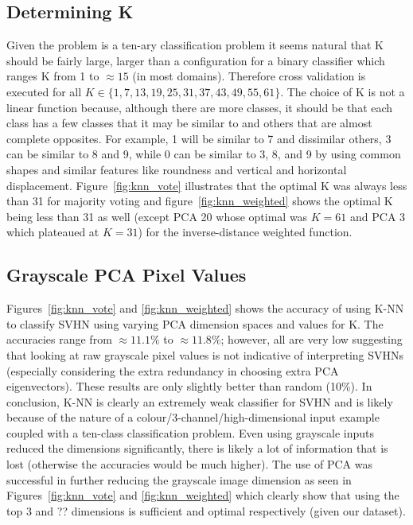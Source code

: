 \documentclass{article} %
\begin{document}
\subsection{Determining K} \label{knn_k}
Given the problem is a ten-ary classification problem it seems natural that K should be fairly large, larger than a configuration for a binary classifier which ranges K from 1 to $\approx 15$ (in most domains).  Therefore cross validation is executed for all $K \in \{1, 7, 13, 19, 25, 31, 37, 43, 49, 55, 61\}$.  The choice of K is not a linear function because, although there are more classes, it should be that each class has a few classes that it may be similar to and others that are almost complete opposites.  For example, 1 will be similar to 7 and dissimilar others, 3 can be similar to 8 and 9, while 0 can be similar to 3, 8, and 9 by using common shapes and similar features like roundness and vertical and horizontal displacement.  Figure~\ref{fig:knn_vote} illustrates that the optimal K was always less than 31 for majority voting and figure~\ref{fig:knn_weighted} shows the optimal K being less than 31 as well (except PCA 20 whose optimal was $K=61$ and PCA 3 which plateaued at $K=31$) for the inverse-distance weighted function.

\subsection{Grayscale PCA Pixel Values}
Figures~\ref{fig:knn_vote} and \ref{fig:knn_weighted} shows the accuracy of using K-NN to classify SVHN using varying PCA dimension spaces and values for K. The accuracies range from $\approx 11.1\%$ to $\approx 11.8\%$; however, all are very low suggesting that looking at raw grayscale pixel values is not indicative of interpreting SVHNs (especially considering the extra redundancy in choosing extra PCA eigenvectors).  These results are only slightly better than random (10\%).  In conclusion, K-NN is clearly an extremely weak classifier for SVHN and is likely because of the nature of a colour/3-channel/high-dimensional input example coupled with a ten-class classification problem.  Even using grayscale inputs reduced the dimensions significantly, there is likely a lot of information that is lost (otherwise the accuracies would be much higher).  The use of PCA was successful in further reducing the grayscale image dimension as seen in Figures~\ref{fig:knn_vote} and \ref{fig:knn_weighted} which clearly show that using the top 3 and ?? dimensions is sufficient and optimal respectively (given our dataset).
\end{document}
